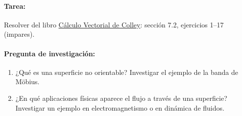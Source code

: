 \documentclass[a4,11pt]{aleph-notas}
\begin{document}
\paragraph{Tarea:}
Resolver del libro \href{https://catalogobiblioteca.puce.edu.ec/cgi-bin/koha/opac-detail.pl?biblionumber=83405&query_desc=su%3A%22An%C3%A1lisis%20vectorial%22}{Cálculo Vectorial de Colley}: sección 7.2, ejercicios 1--17 (impares).

\paragraph{Pregunta de investigación:}
\begin{enumerate}[leftmargin=*]
    \item ¿Qué es una superficie no orientable? Investigar el ejemplo de la banda de Möbius.
    \item ¿En qué aplicaciones físicas aparece el flujo a través de una superficie? Investigar un ejemplo en electromagnetismo o en dinámica de fluidos.
\end{enumerate}
 
\end{document}

